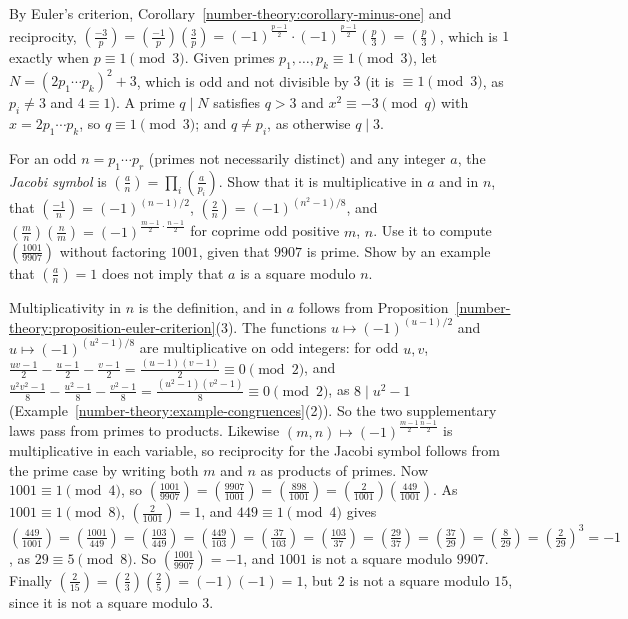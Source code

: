 \begin{solution}
By Euler's criterion, Corollary~\ref{number-theory:corollary-minus-one} and reciprocity, $(\frac{-3}{p}) = (\frac{-1}{p})(\frac{3}{p}) = (-1)^{\frac{p-1}{2}} \cdot (-1)^{\frac{p-1}{2}}(\frac{p}{3}) = (\frac{p}{3})$,
which is $1$ exactly when $p \equiv 1 \pmod 3$. Given primes $p_1, \ldots, p_k \equiv 1 \pmod 3$, let $N = (2p_1 \cdots p_k)^2 + 3$, which is odd and not divisible by $3$ (it is $\equiv 1 \pmod 3$, as
$p_i \neq 3$ and $4 \equiv 1$). A prime $q \mid N$ satisfies $q > 3$ and $x^2 \equiv -3 \pmod q$ with $x = 2p_1 \cdots p_k$, so $q \equiv 1 \pmod 3$; and $q \neq p_i$, as otherwise $q \mid 3$.
\end{solution}

\begin{exercise}\label{number-theory:exercise-jacobi}
For an odd $n = p_1 \cdots p_r$ (primes not necessarily distinct) and any integer $a$, the \emph{Jacobi symbol} is $(\frac{a}{n}) = \prod_i(\frac{a}{p_i})$. Show that it is multiplicative in $a$ and in $n$,
that $(\frac{-1}{n}) = (-1)^{(n-1)/2}$, $(\frac{2}{n}) = (-1)^{(n^2-1)/8}$, and $(\frac{m}{n})(\frac{n}{m}) = (-1)^{\frac{m-1}{2}\cdot\frac{n-1}{2}}$ for coprime odd positive $m$, $n$. Use it to compute
$(\frac{1001}{9907})$ without factoring $1001$, given that $9907$ is prime. Show by an example that $(\frac{a}{n}) = 1$ does not imply that $a$ is a square modulo $n$.
\end{exercise}

\begin{solution}
Multiplicativity in $n$ is the definition, and in $a$ follows from Proposition~\ref{number-theory:proposition-euler-criterion}(3). The functions $u \mapsto (-1)^{(u-1)/2}$ and $u \mapsto (-1)^{(u^2-1)/8}$
are multiplicative on odd integers: for odd $u, v$, $\frac{uv - 1}{2} - \frac{u - 1}{2} - \frac{v - 1}{2} = \frac{(u - 1)(v - 1)}{2} \equiv 0 \pmod 2$, and
$\frac{u^2v^2 - 1}{8} - \frac{u^2 - 1}{8} - \frac{v^2 - 1}{8} = \frac{(u^2 - 1)(v^2 - 1)}{8} \equiv 0 \pmod 2$, as $8 \mid u^2 - 1$ (Example~\ref{number-theory:example-congruences}(2)). So the two
supplementary laws pass from primes to products. Likewise $(m, n) \mapsto (-1)^{\frac{m-1}{2}\frac{n-1}{2}}$ is multiplicative in each variable, so reciprocity for the Jacobi symbol follows from the prime
case by writing both $m$ and $n$ as products of primes. Now $1001 \equiv 1 \pmod 4$, so $(\frac{1001}{9907}) = (\frac{9907}{1001}) = (\frac{898}{1001}) = (\frac{2}{1001})(\frac{449}{1001})$. As
$1001 \equiv 1 \pmod 8$, $(\frac{2}{1001}) = 1$, and $449 \equiv 1 \pmod 4$ gives $(\frac{449}{1001}) = (\frac{1001}{449}) = (\frac{103}{449}) = (\frac{449}{103}) = (\frac{37}{103}) = (\frac{103}{37}) =
(\frac{29}{37}) = (\frac{37}{29}) = (\frac{8}{29}) = (\frac{2}{29})^3 = -1$, as $29 \equiv 5 \pmod 8$. So $(\frac{1001}{9907}) = -1$, and $1001$ is not a square modulo $9907$. Finally
$(\frac{2}{15}) = (\frac{2}{3})(\frac{2}{5}) = (-1)(-1) = 1$, but $2$ is not a square modulo $15$, since it is not a square modulo $3$.
\end{solution}


